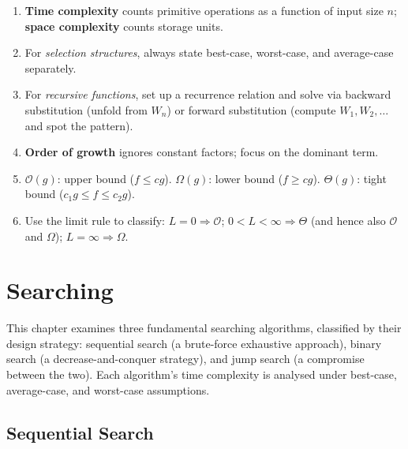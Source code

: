 \documentclass[11pt, a4paper, notitlepage]{report}
\theoremstyle{definition}
\theoremstyle{remark}
\theoremstyle{definition}
\begin{document}
\begin{keyresult}[title={Chapter Summary: Analysis of Algorithms}]
\begin{enumerate}
  \item \textbf{Time complexity} counts primitive operations as a function of
        input size $n$; \textbf{space complexity} counts storage units.
  \item For \emph{selection structures}, always state best-case, worst-case,
        and average-case separately.
  \item For \emph{recursive functions}, set up a recurrence relation and solve
        via backward substitution (unfold from $W_n$) or forward substitution
        (compute $W_1, W_2, \ldots$ and spot the pattern).
  \item \textbf{Order of growth} ignores constant factors; focus on the
        dominant term.
  \item $\mathcal{O}(g)$: upper bound ($f \le cg$).
        $\Omega(g)$: lower bound ($f \ge cg$).
        $\Theta(g)$: tight bound ($c_1 g \le f \le c_2 g$).
  \item Use the limit rule to classify:
        $L=0 \Rightarrow \mathcal{O}$;
        $0 < L < \infty \Rightarrow \Theta$ (and hence also $\mathcal{O}$ and $\Omega$);
        $L=\infty \Rightarrow \Omega$.
\end{enumerate}
\end{keyresult}

\chapter{Searching}
\label{ch:searching}

This chapter examines three fundamental searching algorithms, classified by their
design strategy: sequential search (a brute-force exhaustive approach), binary
search (a decrease-and-conquer strategy), and jump search (a compromise between
the two).  Each algorithm's time complexity is analysed under best-case,
average-case, and worst-case assumptions.

\section{Sequential Search}
\label{sec:sequential-search}
\end{document}
